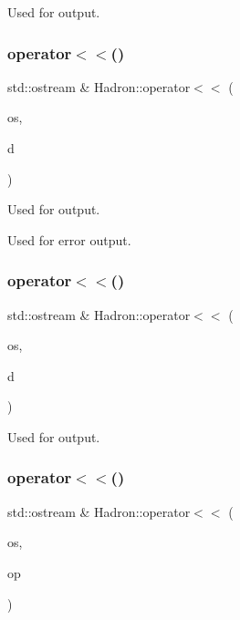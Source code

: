 Used for output. 

\mbox{\label{namespaceHadron_a0c52fe94d4afb343c44206908152316e}} 
\subsubsection{\texorpdfstring{operator$<$$<$()}{operator<<()}\hspace{0.1cm}{\footnotesize\ttfamily [10/48]}}
{\footnotesize\ttfamily std\+::ostream \& Hadron\+::operator$<$$<$ (\begin{DoxyParamCaption}\item[{std\+::ostream \&}]{os,  }\item[{const \mbox{\hyperlink{structHadron_1_1KeyHadronNode__t_1_1Quark__t}{Key\+Hadron\+Node\+\_\+t\+::\+Quark\+\_\+t}} \&}]{d }\end{DoxyParamCaption})}



Used for output. 

Used for error output. \mbox{\label{namespaceHadron_aa163d93f390345d74a2db05417fba452}} 
\subsubsection{\texorpdfstring{operator$<$$<$()}{operator<<()}\hspace{0.1cm}{\footnotesize\ttfamily [11/48]}}
{\footnotesize\ttfamily std\+::ostream \& Hadron\+::operator$<$$<$ (\begin{DoxyParamCaption}\item[{std\+::ostream \&}]{os,  }\item[{const \mbox{\hyperlink{structHadron_1_1KeyCGCIrrepMom__t}{Key\+C\+G\+C\+Irrep\+Mom\+\_\+t}} \&}]{d }\end{DoxyParamCaption})}



Used for output. 

\mbox{\label{namespaceHadron_a99d886a5455746fba4c549c7a072c731}} 
\subsubsection{\texorpdfstring{operator$<$$<$()}{operator<<()}\hspace{0.1cm}{\footnotesize\ttfamily [12/48]}}
{\footnotesize\ttfamily std\+::ostream \& Hadron\+::operator$<$$<$ (\begin{DoxyParamCaption}\item[{std\+::ostream \&}]{os,  }\item[{const \mbox{\hyperlink{structHadron_1_1QuarkNum__t}{Quark\+Num\+\_\+t}} \&}]{op }\end{DoxyParamCaption})}



